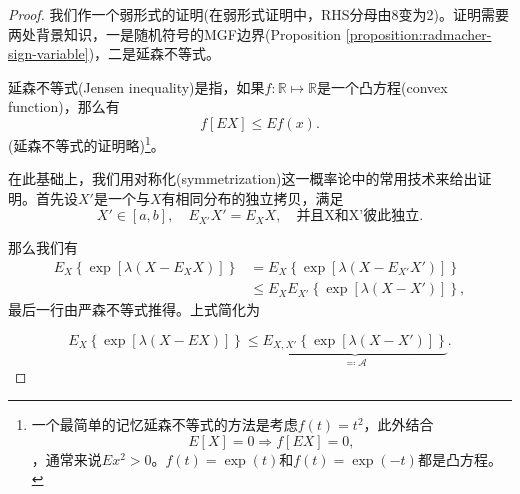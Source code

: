 \begin{proof}
  我们作一个弱形式的证明(在弱形式证明中，RHS分母由8变为2)。证明需要两处背景知识，一是随机符号的MGF边界(Proposition \ref{proposition:radmacher-sign-variable})，二是延森不等式。

  延森不等式(Jensen inequality)是指，如果$f:\mathbb{R} \mapsto \mathbb{R}$是一个凸方程(convex function)，那么有
  \begin{equation}
    \label{eq:lln-slln-jensen-inequality}
    f \left[ E X \right] \le E f(x).
  \end{equation}
  (延森不等式的证明略)\footnote{一个最简单的记忆延森不等式的方法是考虑$f(t)=t^{2}$，此外结合
  \begin{equation*}
    E[X] = 0 \Longrightarrow f \left[ E X \right] = 0,
  \end{equation*}
  ，通常来说$E x^{2} > 0$。$f(t) = \exp \left( t \right)$和$f(t) = \exp \left( - t \right)$都是凸方程。 }。

  在此基础上，我们用对称化(symmetrization)这一概率论中的常用技术来给出证明。首先设$X'$是一个与$X$有相同分布的独立拷贝，满足
  \begin{equation*}
    X' \in \left[a,b \right], \quad E_{X'} X' = E_{X} X, \quad \text{并且X和X'彼此独立}.
  \end{equation*}

  那么我们有
  \begin{equation*}
    \begin{split}
      E_{X} \left\{
      \exp
      \left[
      \lambda
      \left(
      X - E_{X} X
      \right)
      \right]
      \right\}
      & =
      E_{X}
      \left\{
      \exp
      \left[
      \lambda
      \left(
      X - E_{X'} X'
      \right)
      \right]
      \right\} \\
      & \le E_{X} E_{X'}
      \left\{
      \exp \left[
      \lambda
      \left(
      X - X'
      \right)
      \right]
      \right\},
    \end{split}
  \end{equation*}
最后一行由严森不等式推得。上式简化为

\begin{equation}
  \label{eq:lln-slln-jensen-inequality-mid1}
  E_{X} \left\{
  \exp \left[ \lambda \left( X - E X \right)\right]
  \right\}
  \le
  \underbrace{
  E_{X,X'} \left\{
  \exp \left[
  \lambda \left( X - X' \right)
  \right]
  \right\}
  }_{\eqqcolon \mathcal{A}}.
\end{equation}


\end{proof}

